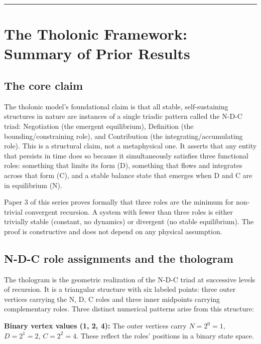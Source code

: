 \documentclass[12pt]{article}
\begin{document}
\begin{center}\rule{0.5\linewidth}{0.5pt}\end{center}

\section{The Tholonic Framework: Summary of Prior Results}\label{the-tholonic-framework-summary-of-prior-results}

\subsection{The core claim}\label{the-core-claim}

The tholonic model's foundational claim is that all stable,
self-sustaining structures in nature are instances of a single triadic
pattern called the N-D-C triad: Negotiation (the emergent equilibrium),
Definition (the bounding/constraining role), and Contribution (the
integrating/accumulating role). This is a structural claim, not a
metaphysical one. It asserts that any entity that persists in time does
so because it simultaneously satisfies three functional roles: something
that limits its form (D), something that flows and integrates across
that form (C), and a stable balance state that emerges when D and C are
in equilibrium (N).

Paper 3 of this series proves formally that three roles are the minimum
for non-trivial convergent recursion. A system with fewer than three
roles is either trivially stable (constant, no dynamics) or divergent
(no stable equilibrium). The proof is constructive and does not depend
on any physical assumption.

\subsection{N-D-C role assignments and the thologram}\label{n-d-c-role-assignments-and-the-thologram}

The thologram is the geometric realization of the N-D-C triad at
successive levels of recursion. It is a triangular structure with six
labeled points: three outer vertices carrying the N, D, C roles and
three inner midpoints carrying complementary roles. Three distinct
numerical patterns arise from this structure:

\textbf{Binary vertex values (1, 2, 4):} The outer vertices carry
\(N = 2^0 = 1\), \(D = 2^1 = 2\), \(C = 2^2 = 4\). These reflect the
roles' positions in a binary state space.
\end{document}
